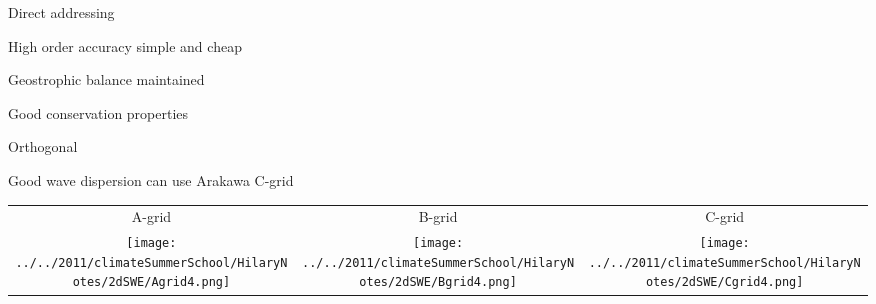 \begin{slide}

\begin{list0}
\item Direct addressing
\item High order accuracy simple and cheap
\item Geostrophic balance maintained
\item Good conservation properties
\item Orthogonal
\item Good wave dispersion can use Arakawa C-grid
\end{list0}

\begin{tabular}{ccc} A-grid & B-grid & C-grid \\
\texttt{[image: ../../2011/climateSummerSchool/HilaryNotes/2dSWE/Agrid4.png]}&
\texttt{[image: ../../2011/climateSummerSchool/HilaryNotes/2dSWE/Bgrid4.png]}&
\texttt{[image: ../../2011/climateSummerSchool/HilaryNotes/2dSWE/Cgrid4.png]}
\end{tabular}

\end{slide}

